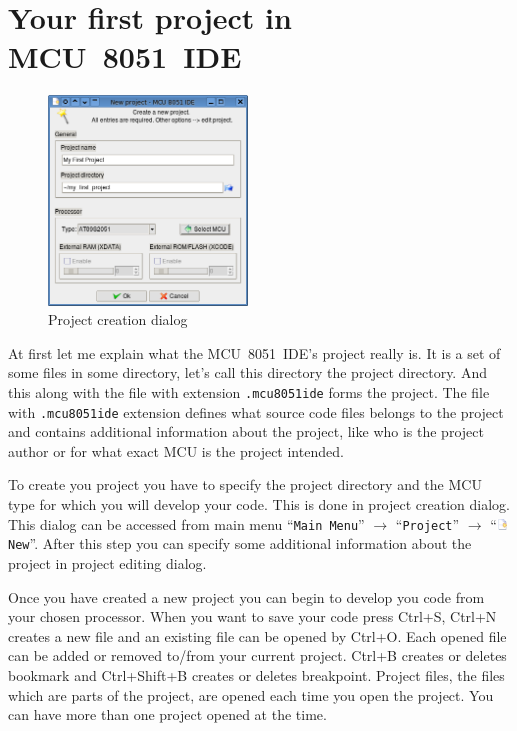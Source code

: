 \documentclass[a4paper,twoside,12pt]{book}
\newcommand{\menuitem}[1]{\texttt{#1}}
\newcommand{\fileextension}[1]{\texttt{#1}}
\begin{document}
	\section{Your first project in MCU~8051~IDE}
		\begin{figure}
			\centering{}
			\includegraphics[width=150pt]{img/025.png}
			\caption{Project creation dialog}
		\end{figure}
		At first let me explain what the MCU~8051~IDE's project really is. It is a set of some files in some directory, let's call this directory the project directory. And this along with the file with extension \fileextension{.mcu8051ide} forms the project. The file with \fileextension{.mcu8051ide} extension defines what source code files belongs to the project and contains additional information about the project, like who is the project author or for what exact MCU is the project intended.

		To create you project you have to specify the project directory and the MCU type for which you will develop your code. This is done in project creation dialog. This dialog can be accessed from main menu ``\menuitem{Main Menu}'' $\rightarrow$ ``\menuitem{Project}'' $\rightarrow$ ``\includegraphics[height=8pt]{img/filenew.png} \menuitem{New}''. After this step you can specify some additional information about the project in project editing dialog.

		Once you have created a new project you can begin to develop you code from your chosen processor. When you want to save your code press Ctrl+S, Ctrl+N creates a new file and an existing file can be opened by Ctrl+O. Each opened file can be added or removed to/from your current project. Ctrl+B creates or deletes bookmark and Ctrl+Shift+B creates or deletes breakpoint. Project files, the files which are parts of the project, are opened each time you open the project. You can have more than one project opened at the time.
\end{document}
